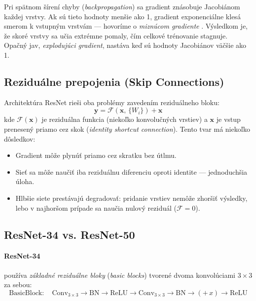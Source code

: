 \documentclass[12pt,a4paper]{article}
\begin{document}
Pri spätnom šírení chyby (\textit{backpropagation}) sa gradient znásobuje
Jacobiánom každej vrstvy. Ak sú tieto hodnoty menšie ako 1, gradient exponenciálne
klesá smerom k vstupným vrstvám — hovoríme o \textit{miznúcom gradiente} \cite{hochreiter1991}.
Výsledkom je, že skoré vrstvy sa učia extrémne pomaly, čím celkové trénovanie stagnuje.
Opačný jav, \textit{explodujúci gradient}, nastáva keď sú hodnoty Jacobiánov väčšie ako 1.

\subsection{Reziduálne prepojenia (Skip Connections)}

Architektúra ResNet \cite{he2016deep} rieši oba problémy zavedením reziduálneho bloku:
\begin{equation}
  \mathbf{y} = \mathcal{F}(\mathbf{x},\, \{W_i\}) + \mathbf{x}
\end{equation}
kde $\mathcal{F}(\mathbf{x})$ je reziduálna funkcia (niekoľko konvolučných vrstiev)
a $\mathbf{x}$ je vstup prenesený priamo cez skok (\textit{identity shortcut connection}).
Tento tvar má niekoľko dôsledkov:
\begin{itemize}
  \item Gradient môže plynúť priamo cez skratku bez útlmu.
  \item Sieť sa môže naučiť iba reziduálnu diferenciu oproti identite — jednoduchšia úloha.
  \item Hlbšie siete prestávajú degradovať: pridanie vrstiev nemôže zhoršiť výsledky,
        lebo v najhoršom prípade sa naučia nulový reziduál ($\mathcal{F} = 0$).
\end{itemize}

\subsection{ResNet-34 vs. ResNet-50}

\paragraph{ResNet-34} používa \textit{základné reziduálne bloky} (\textit{basic blocks})
tvorené dvoma konvolúciami $3 \times 3$ za sebou:
\begin{equation}
  \text{BasicBlock}: \quad \text{Conv}_{3\times3} \to \text{BN} \to \text{ReLU}
                        \to \text{Conv}_{3\times3} \to \text{BN} \to (+\,x) \to \text{ReLU}
\end{equation}
\end{document}
